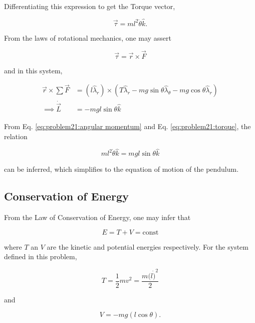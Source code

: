 Differentiating this expression to get the Torque vector,

\begin{equation}
    \vec{\tau} = ml^2\ddot\theta\hat{k}.
\end{equation}

From the laws of rotational mechanics, one may assert

\begin{equation}
    \vec{\tau} = \vec{r} \times \vec{F} 
\end{equation}

and in this system,

\begin{align}
    \vec{r} \times \sum\vec{F} &=
    (l\hat\lambda_r) \times \left(T\hat\lambda_r - mg\sin\theta \hat\lambda_\theta - mg\cos\theta \hat\lambda_r \right)
    \nonumber \\
    \implies \dot{\vec{L}} &= -mgl \sin\theta \hat{k}
    \label{eq:problem21:torque}
\end{align}

From Eq. \ref{eq:problem21:angular momentum} and Eq. \ref{eq:problem21:torque}, the relation

\begin{equation}
    ml^2 \dot\theta \hat{k} = mgl \sin\theta \hat{k}
\end{equation}

can be inferred, which simplifies to the equation of motion of the pendulum.

\subsection{Conservation of Energy}
From the Law of Conservation of Energy, one may infer that

\begin{equation}
    E = T + V = \text{const}
\end{equation}

where $T$ an $V$ are the kinetic and potential energies respectively. For the system defined in this problem,

\begin{equation}
    T = \frac{1}{2}mv^2 = \frac{m(l\dot)^2}{2}
    \label{eq:problem21:kinetic energy}
\end{equation}

and

\begin{equation}
    V = -mg (l\cos\theta).
\end{equation}

